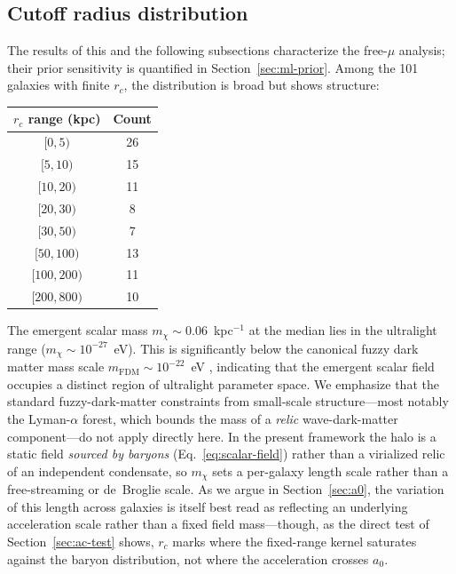 \documentclass[11pt,a4paper]{article}
\begin{document}
\subsection{Cutoff radius distribution}

The results of this and the following subsections characterize the
free-$\mu$ analysis; their prior sensitivity is quantified in
Section~\ref{sec:ml-prior}.
Among the 101 galaxies with finite $r_c$, the distribution
is broad but shows structure:

\begin{center}
\begin{tabular}{cc}
\toprule
$r_c$ range (kpc) & Count \\
\midrule
$[0, 5)$ & 26 \\
$[5, 10)$ & 15 \\
$[10, 20)$ & 11 \\
$[20, 30)$ & 8 \\
$[30, 50)$ & 7 \\
$[50, 100)$ & 13 \\
$[100, 200)$ & 11 \\
$[200, 800)$ & 10 \\
\bottomrule
\end{tabular}
\end{center}

The emergent scalar mass $m_\chi \sim 0.06$~kpc$^{-1}$ at the
median lies in the ultralight range ($m_\chi \sim 10^{-27}$~eV).
This is significantly below the canonical fuzzy dark matter mass
scale $m_{\mathrm{FDM}} \sim 10^{-22}$~eV
\cite{Hu:2000ke,Hui:2016ltb}, indicating that the emergent scalar
field occupies a distinct region of ultralight parameter space.
We emphasize that the standard fuzzy-dark-matter constraints from
small-scale structure---most notably the Lyman-$\alpha$ forest,
which bounds the mass of a \emph{relic} wave-dark-matter
component---do not apply directly here.  In the present framework
the halo is a static field \emph{sourced by baryons}
(Eq.~\ref{eq:scalar-field}) rather than a virialized relic of an
independent condensate, so $m_\chi$ sets a per-galaxy length scale
rather than a free-streaming or de~Broglie scale.  As we argue in
Section~\ref{sec:a0}, the variation of this length across galaxies
is itself best read as reflecting an underlying acceleration scale
rather than a fixed field mass---though, as the direct test of
Section~\ref{sec:ac-test} shows, $r_c$ marks where the fixed-range
kernel saturates against the baryon distribution, not where the
acceleration crosses $a_0$.
\end{document}

